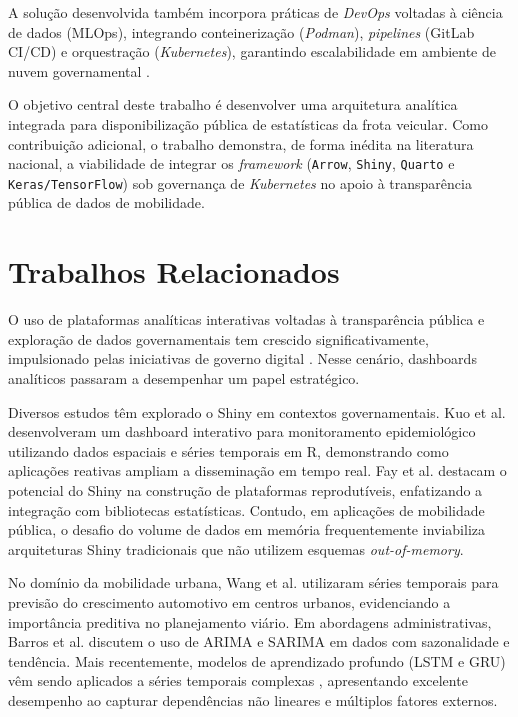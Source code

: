 \documentclass[10pt,conference]{IEEEtran}
\begin{document}
A solução desenvolvida também incorpora práticas de \textit{DevOps} voltadas à ciência de dados (MLOps), integrando conteinerização (\textit{Podman}), \textit{pipelines} (GitLab CI/CD) e orquestração (\textit{Kubernetes}), garantindo escalabilidade em ambiente de nuvem governamental \cite{humble2010, burns2016borgomega}.

O objetivo central deste trabalho é desenvolver uma arquitetura analítica integrada para disponibilização pública de estatísticas da frota veicular. Como contribuição adicional, o trabalho demonstra, de forma inédita na literatura nacional, a viabilidade de integrar os \textit{framework} (\texttt{Arrow}, \texttt{Shiny}, \texttt{Quarto} e \texttt{Keras/TensorFlow}) sob governança de \textit{Kubernetes} no apoio à transparência pública de dados de mobilidade.


\section{Trabalhos Relacionados}

O uso de plataformas analíticas interativas voltadas à transparência pública e exploração de dados governamentais tem crescido significativamente, impulsionado pelas iniciativas de governo digital \cite{janssen2012}. Nesse cenário, dashboards analíticos passaram a desempenhar um papel estratégico.

Diversos estudos têm explorado o Shiny em contextos governamentais. Kuo et al. \cite{kuo2019} desenvolveram um dashboard interativo para monitoramento epidemiológico utilizando dados espaciais e séries temporais em R, demonstrando como aplicações reativas ampliam a disseminação em tempo real. Fay et al. \cite{fay2021} destacam o potencial do Shiny na construção de plataformas reprodutíveis, enfatizando a integração com bibliotecas estatísticas. Contudo, em aplicações de mobilidade pública, o desafio do volume de dados em memória frequentemente inviabiliza arquiteturas Shiny tradicionais que não utilizem esquemas \textit{out-of-memory}.


No domínio da mobilidade urbana, Wang et al. \cite{wang2020} utilizaram séries temporais para previsão do crescimento automotivo em centros urbanos, evidenciando a importância preditiva no planejamento viário. Em abordagens administrativas, Barros et al. \cite{barros2017} discutem o uso de ARIMA e SARIMA em dados com sazonalidade e tendência. Mais recentemente, modelos de aprendizado profundo (LSTM e GRU) vêm sendo aplicados a séries temporais complexas \cite{ghojogh2023recurrentneuralnetworkslong}, apresentando excelente desempenho ao capturar dependências não lineares e múltiplos fatores externos.
\end{document}
